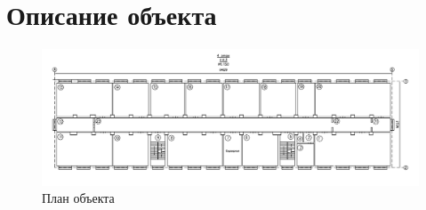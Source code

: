 \section{Описание объекта}

\begin{figure}
    \centering
    \includegraphics[width=260mm]{images/План объекта}
    \captionsetup{justification=centering}
    \caption{План объекта}
    \label{fig::object_placement}
\end{figure}

